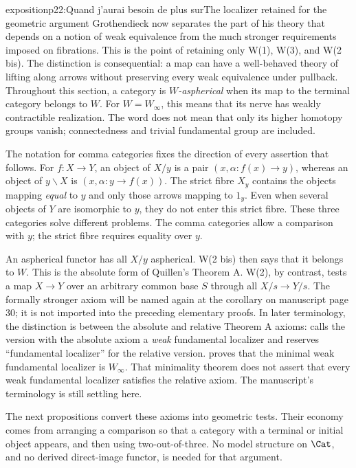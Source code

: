 \begin{dcomment}{exposition}{p22:Quand j'aurai besoin de plus sur}{The localizer retained for the geometric argument}
Grothendieck now separates the part of his theory that depends on a notion of weak equivalence from the much stronger requirements imposed on fibrations. This is the point of retaining only W(1), W(3), and W(2 bis). The distinction is consequential: a map can have a well-behaved theory of lifting along arrows without preserving every weak equivalence under pullback. Throughout this section, a category is \emph{$W$-aspherical} when its map to the terminal category belongs to $W$. For $W=W_\infty$, this means that its nerve has weakly contractible realization. The word does not mean that only its higher homotopy groups vanish; connectedness and trivial fundamental group are included.

The notation for comma categories fixes the direction of every assertion that follows. For $f:X\to Y$, an object of $X/y$ is a pair $(x,\alpha:f(x)\to y)$, whereas an object of $y\backslash X$ is $(x,\alpha:y\to f(x))$. The strict fibre $X_y$ contains the objects mapping \emph{equal} to $y$ and only those arrows mapping to $1_y$. Even when several objects of $Y$ are isomorphic to $y$, they do not enter this strict fibre. These three categories solve different problems. The comma categories allow a comparison with $y$; the strict fibre requires equality over $y$.

An aspherical functor has all $X/y$ aspherical. W(2 bis) then says that it belongs to $W$. This is the absolute form of Quillen's Theorem A. W(2), by contrast, tests a map $X\to Y$ over an arbitrary common base $S$ through all $X/s\to Y/s$. The formally stronger axiom will be named again at the corollary on manuscript page 30; it is not imported into the preceding elementary proofs. In later terminology, the distinction is between the absolute and relative Theorem A axioms: \citet[\S1.1]{Maltsiniotis2012Exact} calls the version with the absolute axiom a \emph{weak} fundamental localizer and reserves ``fundamental localizer'' for the relative version. \citet[Theorem 6.1.18]{Cisinski2006} proves that the minimal weak fundamental localizer is $W_\infty$. That minimality theorem does not assert that every weak fundamental localizer satisfies the relative axiom. The manuscript's terminology is still settling here.

The next propositions convert these axioms into geometric tests. Their economy comes from arranging a comparison so that a category with a terminal or initial object appears, and then using two-out-of-three. No model structure on $\Cat$, and no derived direct-image functor, is needed for that argument.
\end{dcomment}

